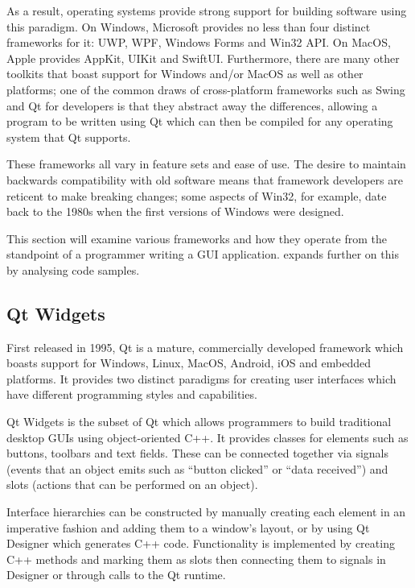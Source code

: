 \documentclass[11pt]{report}
\begin{document}
As a result, operating systems provide strong support for building software using this paradigm. On Windows, Microsoft provides no less than four distinct frameworks for it\cite{Win32APIs}: UWP, WPF, Windows Forms and Win32 API. On MacOS, Apple provides AppKit\cite{appkit}, UIKit\cite{uikit} and SwiftUI\cite{SwiftUI}. Furthermore, there are many other toolkits that boast support for Windows and/or MacOS as well as other platforms; one of the common draws of cross-platform frameworks such as Swing and Qt for developers is that they abstract away the differences, allowing a program to be written using Qt which can then be compiled for any operating system that Qt supports.

These frameworks all vary in feature sets and ease of use. The desire to maintain backwards compatibility with old software means that framework developers are reticent to make breaking changes; some aspects of Win32, for example, date back to the 1980s when the first versions of Windows were designed.

This section will examine various frameworks and how they operate from the standpoint of a programmer writing a GUI application.  expands further on this by analysing code samples.

\subsection{Qt Widgets} \label{secQt}

First released in 1995, Qt is a mature, commercially developed framework which boasts support for Windows, Linux, MacOS, Android, iOS and embedded platforms\cite{AboutQt,QtPlatforms}. It provides two distinct paradigms for creating user interfaces which have different programming styles and capabilities.

Qt Widgets is the subset of Qt which allows programmers to build traditional desktop GUIs using object-oriented C++. It provides classes for elements such as buttons, toolbars and text fields. These can be connected together via signals (events that an object emits such as “button clicked” or “data received”) and slots (actions that can be performed on an object).

Interface hierarchies can be constructed by manually creating each element in an imperative fashion and adding them to a window's layout, or by using Qt Designer which generates C++ code. Functionality is implemented by creating C++ methods and marking them as slots then connecting them to signals in Designer or through calls to the Qt runtime.
\end{document}
